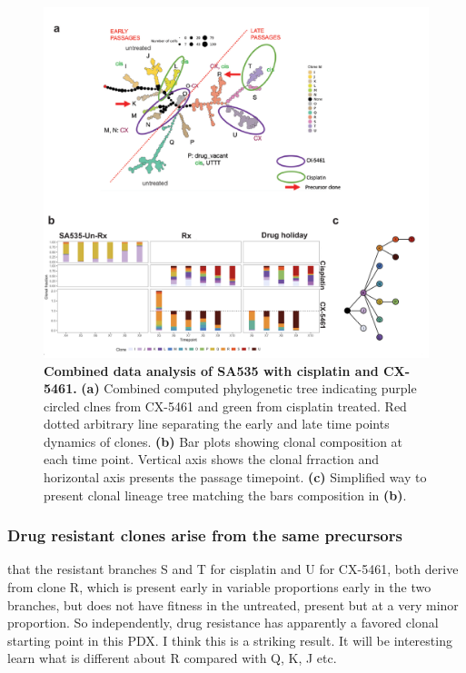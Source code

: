 \begin{figure}
\centering
\includegraphics[width=\textwidth]{Figures/SA535-family_FK.pdf}
	
\caption[Combined data analysis of SA535 with cisplatin and CX-5461]
	{\small
	\textbf{Combined data analysis of SA535 with cisplatin and CX-5461.}
	    \textbf{(a)} Combined computed phylogenetic tree indicating purple circled clnes from CX-5461 and green from cisplatin treated. Red dotted arbitrary line separating the early and late time points dynamics of clones. 
	    \textbf{(b)} Bar plots showing clonal composition at each time point. Vertical axis shows the clonal frraction   and horizontal axis presents the passage timepoint.
	     \textbf{(c)} Simplified way to present clonal lineage tree matching the bars composition in \textbf{(b)}.
	}
	\label{fig:SA535-family_FK}
\end{figure}


\subsubsection{Drug resistant clones arise from the same precursors}
that the resistant branches S and T for cisplatin and U for CX-5461, both derive from clone R, which is present early in variable proportions early in the two branches, but does not have fitness in the untreated, present but at a very minor proportion. So independently, drug resistance has apparently a favored clonal starting point in this PDX. I think this is a striking result. It will be interesting learn what is different about R compared with Q, K, J etc. 








